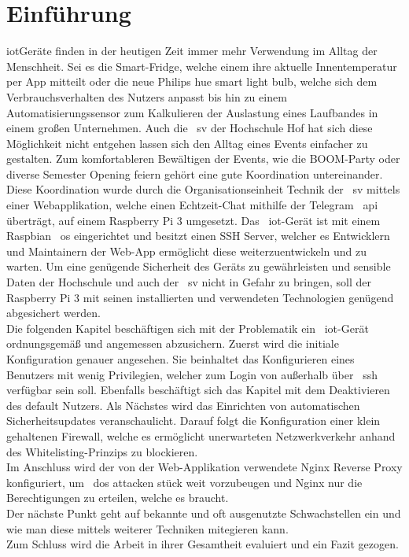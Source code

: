 
\section{Einführung}\label{sec:einfuhrung}
\gls{iot}Geräte finden in der heutigen Zeit immer mehr Verwendung im Alltag der Menschheit.
Sei es die Smart-Fridge, welche einem ihre aktuelle Innentemperatur per App mitteilt oder die neue Philips hue smart light bulb,
welche sich dem Verbrauchsverhalten des Nutzers anpasst bis hin zu einem Automatisierungssensor zum Kalkulieren der Auslastung eines Laufbandes in einem großen Unternehmen.
Auch die ~\gls{sv} der Hochschule Hof hat sich diese Möglichkeit nicht entgehen lassen sich den Alltag eines Events einfacher zu gestalten.
Zum komfortableren Bewältigen der Events, wie die BOOM-Party oder diverse Semester Opening feiern gehört eine gute Koordination untereinander.
Diese Koordination wurde durch die Organisationseinheit Technik der ~\gls{sv} mittels einer Webapplikation, welche einen Echtzeit-Chat mithilfe der Telegram ~\gls{api} überträgt, auf einem Raspberry Pi 3 umgesetzt.
Das ~\gls{iot}-Gerät ist mit einem Raspbian ~\gls{os} eingerichtet und besitzt einen SSH Server, welcher es Entwicklern und Maintainern der Web-App ermöglicht diese weiterzuentwickeln und zu warten.
Um eine genügende Sicherheit des Geräts zu gewährleisten und sensible Daten der Hochschule und auch der ~\gls{sv} nicht in Gefahr zu bringen, soll der Raspberry Pi 3 mit seinen installierten und verwendeten Technologien genügend
abgesichert werden.\\
\blankline
Die folgenden Kapitel beschäftigen sich mit der Problematik ein ~\gls{iot}-Gerät ordnungsgemäß und angemessen abzusichern.
Zuerst wird die initiale Konfiguration genauer angesehen.
Sie beinhaltet das Konfigurieren eines Benutzers mit wenig Privilegien, welcher zum Login von außerhalb über ~\gls{ssh} verfügbar sein soll.
Ebenfalls beschäftigt sich das Kapitel mit dem Deaktivieren des default Nutzers.
Als Nächstes wird das Einrichten von automatischen Sicherheitsupdates veranschaulicht.
Darauf folgt die Konfiguration einer klein gehaltenen Firewall, welche es ermöglicht unerwarteten Netzwerkverkehr anhand des Whitelisting-Prinzips zu blockieren.\\
Im Anschluss wird der von der Web-Applikation verwendete Nginx Reverse Proxy konfiguriert, um ~\gls{dos} attacken stück weit vorzubeugen und Nginx nur die Berechtigungen zu erteilen, welche es braucht. \\
Der nächste Punkt geht auf bekannte und oft ausgenutzte Schwachstellen ein und wie man diese mittels weiterer Techniken mitegieren kann. \\
Zum Schluss wird die Arbeit in ihrer Gesamtheit evaluiert und ein Fazit gezogen.